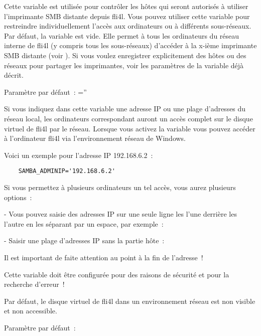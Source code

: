 \begin{description}

    Cette variable est utilisée pour contrôler les hôtes qui seront autorisés
    à utiliser l'imprimante SMB distante depuis fli4l. Vous pouvez utiliser cette
    variable pour restreindre individuellement l'accès aux ordinateurs ou à
    différents sous-réseaux. Par défaut, la variable est vide. Elle permet à
    tous les ordinateurs du réseau interne de fli4l (y compris tous les sous-réseaux)
    d'accéder à la x-ième imprimante SMB distante (voir ).
    Si vous voulez enregistrer explicitement des hôtes ou des réseaux pour
    partager les imprimantes, voir les paramètres de la variable
     déjà décrit.

    Paramètre par défaut~: =''

\end{description}


\begin{description}

        Si vous indiquez dans cette variable une adresse IP ou une plage d'adresses
        du réseau local, les ordinateurs correspondant auront un accès complet
        sur le disque virtuel de fli4l par le réseau.
        Lorsque vous activez la variable  vous pouvez accéder
        à l'ordinateur fli4l via l'environnement réseau de Windows.

        Voici un exemple pour l'adresse IP 192.168.6.2~:

\begin{example}
\begin{verbatim}
    SAMBA_ADMINIP='192.168.6.2'
\end{verbatim}
\end{example}

        Si vous permettez à plusieurs ordinateurs un tel accès, vous aurez
        plusieurs options~:

        - Vous pouvez saisie des adresses IP sur une seule ligne les l'une
        derrière les l'autre en les séparant par un espace, par exemple~:


        - Saisir une plage d'adresses IP sans la partie hôte~:


          Il est important de faite attention au point à la fin de l'adresse~!

        Cette variable doit être configurée pour des raisons de sécurité et
        pour la recherche d'erreur~!

        Par défaut, le disque virtuel de fli4l dans un environnement réseau est
        non visible et non accessible.

        Paramètre par défaut~: 
\end{description}


